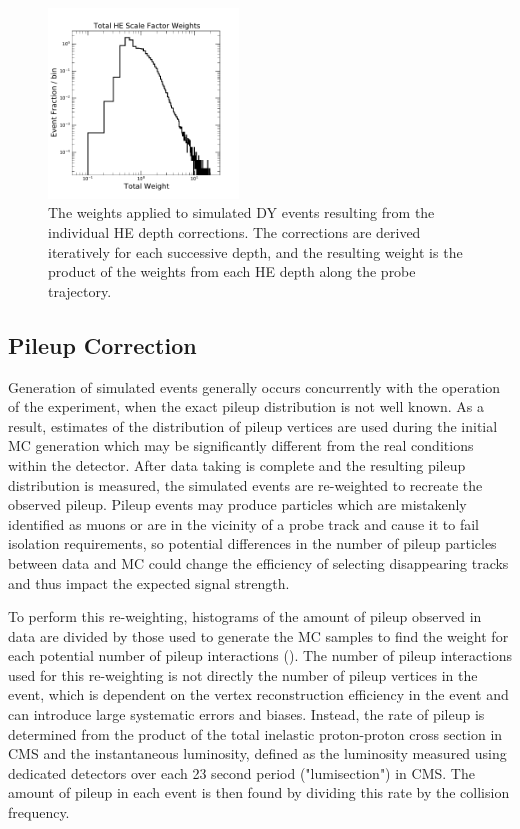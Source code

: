 \begin{figure}[htbp]
	\centering
	\includegraphics[width=0.45\textwidth]{figures/totalHEWeights.pdf}
	\caption[Applied HCAL Scale Factors]{The weights applied to simulated DY events resulting from the individual HE depth corrections. The corrections are derived iteratively for each successive depth, and the resulting weight is the product of the weights from each HE depth along the probe trajectory.} 
        \label{fig:HESFs}
\end{figure}

\subsection{Pileup Correction}
Generation of simulated events generally occurs concurrently with the operation of the experiment, when the exact pileup distribution is not well known.
As a result, estimates of the distribution of pileup vertices are used during the initial MC generation which may be significantly different from the real conditions within the detector. 
After data taking is complete and the resulting pileup distribution is measured, the simulated events are re-weighted to recreate the observed pileup.
Pileup events may produce particles which are mistakenly identified as muons or are in the vicinity of a probe track and cause it to fail isolation requirements, so potential differences in the number of pileup particles between data and MC could change the efficiency of selecting disappearing tracks and thus impact the expected signal strength.

To perform this re-weighting, histograms of the amount of pileup observed in data are divided by those used to generate the MC samples to find the weight for each potential number of pileup interactions ().
The number of pileup interactions used for this re-weighting is not directly the number of pileup vertices in the event, which is dependent on the vertex reconstruction efficiency in the event and can introduce large systematic errors and biases.
Instead, the rate of pileup is determined from the product of the total inelastic proton-proton cross section in CMS and the instantaneous luminosity, defined as the luminosity measured using dedicated detectors over each 23 second period ("lumisection") in CMS.
The amount of pileup in each event is then found by dividing this rate by the collision frequency.

